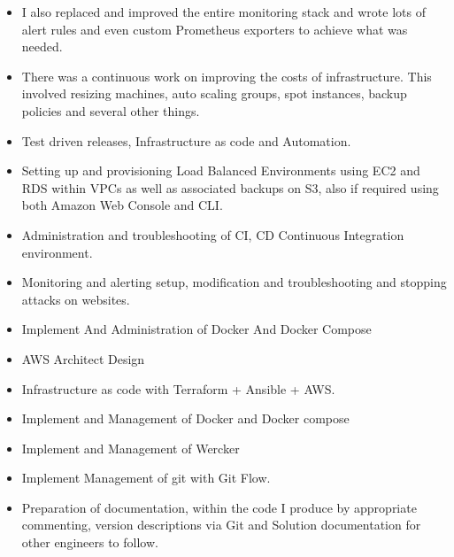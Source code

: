 \documentclass[10pt,a4paper]{altacv}
\begin{document}

\begin{fullwidth}
\makecvheader
\end{fullwidth}


\begin{itemize}
    \item I also replaced and improved the entire monitoring stack and wrote lots of alert rules and even custom Prometheus exporters to achieve what was needed.
    \item There was a continuous work on improving the costs of infrastructure. This involved resizing machines, auto scaling groups, spot instances, backup policies and several other things.
    \item Test driven releases, Infrastructure as code and Automation.
    \item Setting up and provisioning Load Balanced Environments using EC2 and RDS within VPCs as well as associated backups on S3, also if required using both Amazon Web Console and CLI.
    \item Administration and troubleshooting of CI, CD Continuous Integration environment.
    \item Monitoring and alerting setup, modification and troubleshooting and stopping attacks on websites.
    \item Implement And Administration of Docker And Docker Compose
    \item AWS Architect Design
    \item Infrastructure as code with Terraform + Ansible + AWS.
    \item Implement and Management of Docker and Docker compose
    \item Implement and Management of Wercker
    \item Implement Management of git with Git Flow.
    \item Preparation of documentation, within the code I produce by appropriate commenting, version descriptions via Git and Solution documentation for other engineers to follow.
\end{itemize}
\end{document}
